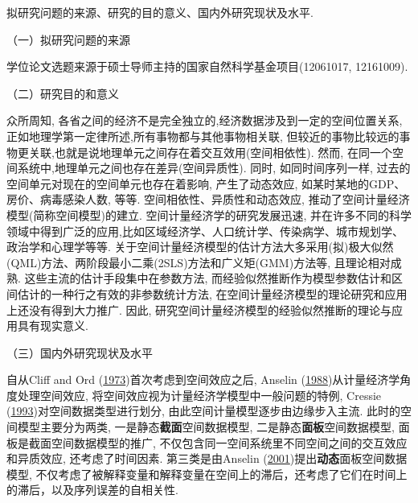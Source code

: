 \documentclass[cs4size]{article}
\def\link{\hyperlink}
\begin{document}
拟研究问题的来源、研究的目的意义、国内外研究现状及水平. 

{\kaishu（一）拟研究问题的来源}

学位论文选题来源于硕士导师主持的国家自然科学基金项目(12061017, 12161009).

{\kaishu（二）研究目的和意义}

众所周知, 各省之间的经济不是完全独立的,经济数据涉及到一定的空间位置关系, 正如地理学第一定律所述,所有事物都与其他事物相关联, 但较近的事物比较远的事物更关联,也就是说地理单元之间存在着交互效用(空间相依性). 然而, 在同一个空间系统中,地理单元之间也存在差异(空间异质性). 同时, 如同时间序列一样, 过去的空间单元对现在的空间单元也存在着影响, 产生了动态效应, 如某时某地的GDP、房价、病毒感染人数, 等等. 空间相依性、异质性和动态效应, 推动了空间计量经济模型(简称空间模型)的建立. 空间计量经济学的研究发展迅速, 并在许多不同的科学领域中得到广泛的应用,比如区域经济学、人口统计学、传染病学、城市规划学、政治学和心理学等等. 关于空间计量经济模型的估计方法大多采用(拟)极大似然(QML)方法、两阶段最小二乘(2SLS)方法和广义矩(GMM)方法等, 且理论相对成熟. 这些主流的估计手段集中在参数方法, 而经验似然推断作为模型参数估计和区间估计的一种行之有效的非参数统计方法, 在空间计量经济模型的理论研究和应用上还没有得到大力推广. 因此, 研究空间计量经济模型的经验似然推断的理论与应用具有现实意义. 

{\kaishu（三）国内外研究现状及水平}

自从Cliff and Ord (\link{Cliff and Ord 1973}{1973})首次考虑到空间效应之后, Anselin (\link{Anselin 1988}{1988})从计量经济学角度处理空间效应, 将空间效应视为计量经济学模型中一般问题的特例, Cressie (\link{Cressie 1993}{1993})对空间数据类型进行划分, 由此空间计量模型逐步由边缘步入主流. 此时的空间模型主要分为两类, 一是静态{\bf 截面}空间数据模型, 二是静态{\bf 面板}空间数据模型, 面板是截面空间数据模型的推广, 不仅包含同一空间系统里不同空间之间的交互效应和异质效应, 还考虑了时间因素. 第三类是由Anselin (\link{Anselin 2001}{2001})提出{\bf 动态}面板空间数据模型, 不仅考虑了被解释变量和解释变量在空间上的滞后，还考虑了它们在时间上的滞后，以及序列误差的自相关性.  
\end{document}
